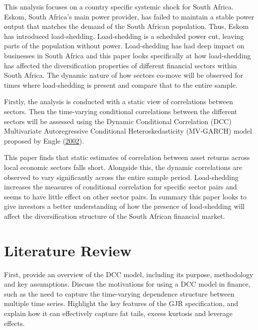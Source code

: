 \documentclass[11pt,preprint, authoryear]{elsarticle}
\numberwithin{equation}{section}
\numberwithin{figure}{section}
\numberwithin{table}{section}
\begin{document}
This analysis focuses on a country specific systemic shock for South
Africa. Eskom, South Africa's main power provider, has failed to
maintain a stable power output that matches the demand of the South
African population. Thus, Eskom has introduced load-shedding.
Load-shedding is a scheduled power cut, leaving parts of the population
without power. Load-shedding has had deep impact on businesses in South
Africa and this paper looks specifically at how load-shedding has
affected the diversification properties of different financial sectors
within South Africa. The dynamic nature of how sectors co-move will be
observed for times where load-shedding is present and compare that to
the entire sample.

Firstly, the analysis is conducted with a static view of correlations
between sectors. Then the time-varying conditional correlations between
the different sectors will be assessed using the Dynamic Conditional
Correlation (DCC) Multivariate Autoregressive Conditional
Heteroskedasticity (MV-GARCH) model proposed by Engle
(\protect\hyperlink{ref-engle2002}{2002}).

This paper finds that static estimates of correlation between asset
returns across local economic sectors falls short. Alongside this, the
dynamic correlations are observed to vary significantly across the
entire sample period. Load-shedding increases the measures of
conditional correlation for specific sector pairs and seems to have
little effect on other sector pairs. In summary this paper looks to give
investors a better understanding of how the presence of load-shedding
will affect the diversification structure of the South African financial
market.

\hypertarget{literature-review}{%
\section{Literature Review}\label{literature-review}}

First, provide an overview of the DCC model, including its purpose,
methodology and key assumptions. Discuss the motivations for using a DCC
model in finance, such as the need to capture the time-varying
dependence structure between multiple time series. Highlight the key
features of the GJR specification, and explain how it can effectively
capture fat tails, excess kurtosis and leverage effects.
\end{document}
